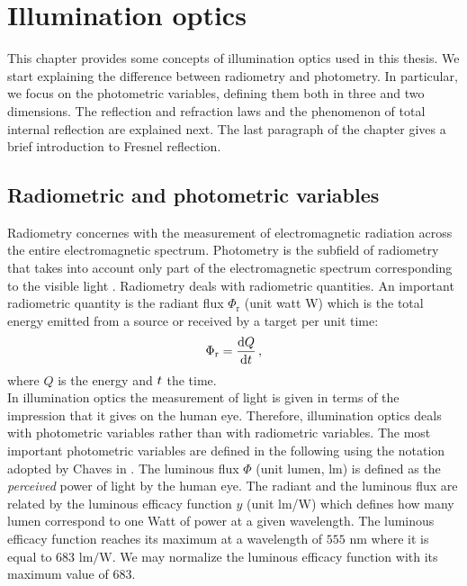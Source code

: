 \chapter{Illumination optics}\label{chap:Illumination optics}
This chapter provides some concepts of illumination optics used in this thesis. We start explaining the difference between radiometry and photometry.
In particular, we focus on the photometric variables, defining them both in three and two dimensions. The reflection and refraction laws and the phenomenon of total internal reflection are explained next. The last paragraph of the chapter gives a brief introduction to Fresnel reflection. 
\section{Radiometric and photometric variables}\label{sec:photometry}
Radiometry concernes with the measurement of electromagnetic radiation across the entire electromagnetic spectrum. Photometry is the subfield of radiometry that takes into account only part of the electromagnetic spectrum corresponding to the visible light \cite{zalewski1995radiometry}. Radiometry deals with radiometric quantities. An important radiometric quantity  is the radiant flux $\Phi_{\textrm{r}}$ (unit watt \textrm{W}) which is the total energy emitted from a source or received by a target per unit time:
\begin{equation}
\Phi_{\textrm{r}} = \frac{\textrm{d}Q}{\textrm{d}t}\,,
\end{equation}
where $Q$ is the energy and $t$ the time.\\
\indent In illumination optics the measurement of light is given in terms of the impression that it gives on the human eye. Therefore, illumination optics deals with photometric variables rather than with radiometric variables. The most important photometric variables are defined in the following using the notation adopted by Chaves in \cite{chaves2015introduction}. The luminous flux $\Phi$ (unit lumen, \textrm{lm}) is defined as the \textit{perceived} power of light by the human eye.
 The radiant and the luminous flux are related by the luminous efficacy function $y$ (unit \textrm{lm}/\textrm{W}) which defines how many lumen correspond to one Watt of power at a given wavelength.
 The luminous efficacy function reaches its maximum  at a wavelength of $555$ $\textrm{nm}$ where it is equal to $683$ $\textrm{lm}/\textrm{W}$.
  We may normalize the luminous efficacy function with its maximum value of $683$.
